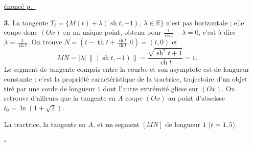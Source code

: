 \documentclass[a4paper,11pt]{article}
\numberwithin{equation}{section}
\numberwithin{figure}{section}
\numberwithin{table}{section}
\theoremstyle{enonce}
\theoremstyle{exemple}
\theoremstyle{remarque}
\newenvironment{corrige}[1]{%
  \par\needspace{6\baselineskip}\vspace{1em}\phantomsection\label{c:#1}%
  \noindent{\sffamily\bfseries\color{Bleu}Exercice~\ref{e:#1}}\quad
  {\scriptsize\sffamily\hyperref[e:#1]{\color{Gris}énoncé p.~\pageref{e:#1}}}\par\nobreak\vspace{0.2em}}%
  {\hfill\textcolor{BleuClair}{$\square$}\par}
\newcommand{\R}{\mathbb{R}}
\newcommand{\sh}{\operatorname{sh}}
\newcommand{\ch}{\operatorname{ch}}
\renewcommand{\th}{\operatorname{th}}
\begin{document}
\begin{corrige}{b-tract}
\textbf{3.} La tangente $T_t=\{M(t)+\lambda(\sh t,-1),\ \lambda\in\R\}$ n'est pas horizontale ; elle coupe donc $(Ox)$
en un unique point, obtenu pour $\frac1{\ch t}-\lambda=0$, c'est-à-dire $\lambda=\frac1{\ch t}$. On trouve
$N=\left(t-\th t+\frac{\sh t}{\ch t},0\right)=(t,0)$ et
\[MN=|\lambda|\,\big\|(\sh t,-1)\big\|=\frac{\sqrt{\sh^2t+1}}{\ch t}=1.\]
Le segment de tangente compris entre la courbe et son asymptote est de longueur constante : c'est la propriété
caractéristique de la tractrice, trajectoire d'un objet tiré par une corde de longueur $1$ dont l'autre extrémité
glisse sur $(Ox)$. On retrouve d'ailleurs que la tangente en $A$ coupe $(Ox)$ au point d'abscisse
$t_0=\ln(1+\sqrt2)$.
\begin{center}

{\small\color{Gris}La tractrice, la tangente en $A$, et un segment $[MN]$ de longueur $1$ ($t=1{,}5$).}
\end{center}
\end{corrige}
\end{document}
